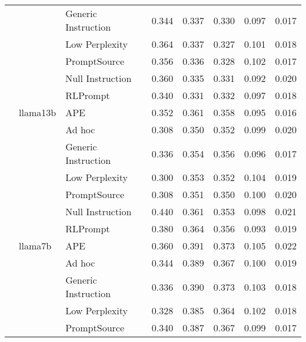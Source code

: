 \begin{supertabular}{lllrrrrr}
              &        & Generic Instruction &            0.344 &           0.337 &          0.330 &        0.097 &    0.017 \\
              &        & Low Perplexity &            0.364 &           0.337 &          0.327 &        0.101 &    0.018 \\
              &        & PromptSource &            0.356 &           0.336 &          0.328 &        0.102 &    0.017 \\
              &        & Null Instruction &            0.360 &           0.335 &          0.331 &        0.092 &    0.020 \\
              &        & RLPrompt &            0.340 &           0.331 &          0.332 &        0.097 &    0.018 \\
              & llama13b & APE &            0.352 &           0.361 &          0.358 &        0.095 &    0.016 \\
              &        & Ad hoc &            0.308 &           0.350 &          0.352 &        0.099 &    0.020 \\
              &        & Generic Instruction &            0.336 &           0.354 &          0.356 &        0.096 &    0.017 \\
              &        & Low Perplexity &            0.300 &           0.353 &          0.352 &        0.104 &    0.019 \\
              &        & PromptSource &            0.308 &           0.351 &          0.350 &        0.100 &    0.020 \\
              &        & Null Instruction &            0.440 &           0.361 &          0.353 &        0.098 &    0.021 \\
              &        & RLPrompt &            0.380 &           0.364 &          0.356 &        0.093 &    0.019 \\
              & llama7b & APE &            0.360 &           0.391 &          0.373 &        0.105 &    0.022 \\
              &        & Ad hoc &            0.344 &           0.389 &          0.367 &        0.100 &    0.019 \\
              &        & Generic Instruction &            0.336 &           0.390 &          0.373 &        0.103 &    0.018 \\
              &        & Low Perplexity &            0.328 &           0.385 &          0.364 &        0.102 &    0.018 \\
              &        & PromptSource &            0.340 &           0.387 &          0.367 &        0.099 &    0.017 \\

\end{supertabular}
